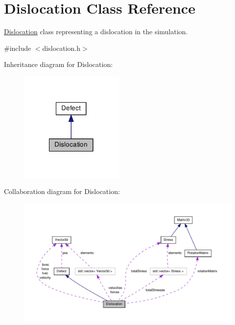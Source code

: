 \hypertarget{classDislocation}{\section{Dislocation Class Reference}
\label{d3/dc6/classDislocation}
}


\hyperlink{classDislocation}{Dislocation} class representing a dislocation in the simulation.  




{\ttfamily \#include $<$dislocation.\-h$>$}



Inheritance diagram for Dislocation\-:\nopagebreak
\begin{figure}[H]
\begin{center}
\leavevmode
\includegraphics[width=146pt]{df/dfa/classDislocation__inherit__graph}
\end{center}
\end{figure}


Collaboration diagram for Dislocation\-:\nopagebreak
\begin{figure}[H]
\begin{center}
\leavevmode
\includegraphics[width=350pt]{d7/d80/classDislocation__coll__graph}
\end{center}
\end{figure}
